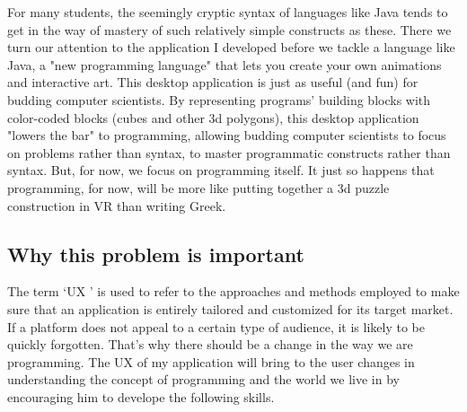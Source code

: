 For many students, the seemingly cryptic syntax of languages like Java tends to get in the way of mastery of such relatively simple constructs as these. There we turn our attention to the application I developed before we tackle a language like Java, a "new programming language" that lets you create your own animations and interactive art. This desktop application is just as useful (and fun) for budding computer scientists. By representing programs' building blocks with color-coded blocks (cubes and other 3d polygons), this desktop application "lowers the bar" to programming, allowing budding computer scientists to focus on problems rather than syntax, to master programmatic constructs rather than syntax. But, for now, we focus on programming itself. It just so happens that programming, for now, will be more like putting together a 3d puzzle construction in VR than writing Greek. 

\subsection{Why this problem is important}

The term ‘UX ’ is used to refer to the approaches and methods employed to make sure that an application is entirely tailored and customized for its target market. If a platform does not appeal to a certain type of audience, it is likely to be quickly forgotten. That's why there should be a change in the way we are programming. The UX of my application will bring to the user changes in understanding the concept of programming and the world we live in by encouraging him to develope the following skills.

